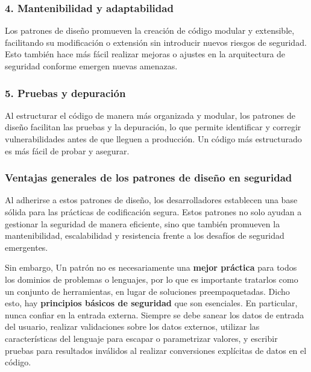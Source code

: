 \subsubsection{4. \textbf{Mantenibilidad y adaptabilidad}}

Los patrones de diseño promueven la creación de código modular y extensible, facilitando su modificación o extensión sin introducir nuevos riesgos de seguridad. Esto también hace más fácil realizar mejoras o ajustes en la arquitectura de seguridad conforme emergen nuevas amenazas.

\subsubsection{5. \textbf{Pruebas y depuración}}

Al estructurar el código de manera más organizada y modular, los patrones de diseño facilitan las pruebas y la depuración, lo que permite identificar y corregir vulnerabilidades antes de que lleguen a producción. Un código más estructurado es más fácil de probar y asegurar.

\subsubsection{Ventajas generales de los patrones de diseño en seguridad}

Al adherirse a estos patrones de diseño, los desarrolladores establecen una base sólida para las prácticas de codificación segura. Estos patrones no solo ayudan a gestionar la seguridad de manera eficiente, sino que también promueven la mantenibilidad, escalabilidad y resistencia frente a los desafíos de seguridad emergentes.

Sin embargo, Un patrón no es necesariamente una \textbf{mejor práctica} para todos los dominios de problemas o lenguajes, por lo que es importante tratarlos como un conjunto de herramientas, en lugar de soluciones preempaquetadas. Dicho esto, hay \textbf{principios básicos de seguridad} que son esenciales. En particular, nunca confiar en la entrada externa. Siempre se debe sanear los datos de entrada del usuario, realizar validaciones sobre los datos externos, utilizar las características del lenguaje para escapar o parametrizar valores, y escribir pruebas para resultados inválidos al realizar conversiones explícitas de datos en el código.